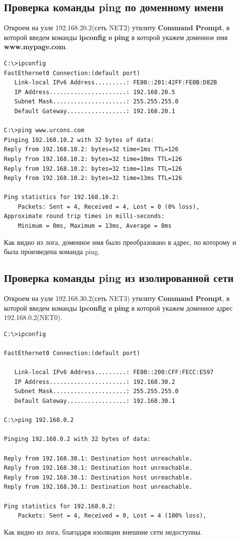 \documentclass[14pt,a4paper,report]{report}
\begin{document}
\subsection{Проверка команды ping по доменному имени}
Откроем на узле 192.168.20.2(сеть NET2) утилиту \textbf{Command Prompt}, в которой введем команды \textbf{ipconfig} и \textbf{ping} в которой укажем доменное имя \textbf{www.mypage.com}.
\begin{lstlisting}[language={}]
C:\>ipconfig
FastEthernet0 Connection:(default port)
   Link-local IPv6 Address.........: FE80::201:42FF:FE0B:D82B
   IP Address......................: 192.168.20.5
   Subnet Mask.....................: 255.255.255.0
   Default Gateway.................: 192.168.20.1

C:\>ping www.urcons.com
Pinging 192.168.10.2 with 32 bytes of data:
Reply from 192.168.10.2: bytes=32 time<1ms TTL=126
Reply from 192.168.10.2: bytes=32 time=10ms TTL=126
Reply from 192.168.10.2: bytes=32 time=11ms TTL=126
Reply from 192.168.10.2: bytes=32 time=13ms TTL=126

Ping statistics for 192.168.10.2:
    Packets: Sent = 4, Received = 4, Lost = 0 (0% loss),
Approximate round trip times in milli-seconds:
    Minimum = 0ms, Maximum = 13ms, Average = 8ms
\end{lstlisting}
Как видно из лога, доменное имя было преобразовано в адрес, по которому и была произведена команда ping.

\subsection{Проверка команды ping из изолированной сети}
Откроем на узле 192.168.30.2(сеть NET3) утилиту \textbf{Command Prompt}, в которой введем команды \textbf{ipconfig} и \textbf{ping} в которой укажем доменное адрес 192.168.0.2(NET0).
\begin{lstlisting}[language={}]
C:\>ipconfig

FastEthernet0 Connection:(default port)

   Link-local IPv6 Address.........: FE80::200:CFF:FECC:E597
   IP Address......................: 192.168.30.2
   Subnet Mask.....................: 255.255.255.0
   Default Gateway.................: 192.168.30.1

C:\>ping 192.168.0.2

Pinging 192.168.0.2 with 32 bytes of data:

Reply from 192.168.30.1: Destination host unreachable.
Reply from 192.168.30.1: Destination host unreachable.
Reply from 192.168.30.1: Destination host unreachable.
Reply from 192.168.30.1: Destination host unreachable.

Ping statistics for 192.168.0.2:
    Packets: Sent = 4, Received = 0, Lost = 4 (100% loss),
\end{lstlisting}
Как видно из лога, благодаря изоляции внешние сети недоступны.
\clearpage
\end{document}
